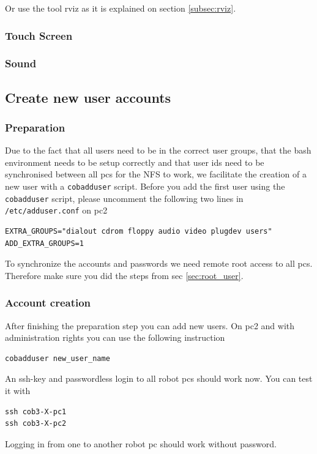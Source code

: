 Or use the tool rviz as it is explained on section \ref{subsec:rviz}.

\subsubsection{Touch Screen} 

\subsubsection{Sound}
 
\subsection{Create new user accounts}
\subsubsection{Preparation}
\label{sec:account}
Due to the fact that all users need to be in the correct user groups, that the bash environment needs to be setup correctly and that user ids need to be synchronised between all pcs for the NFS to work, we facilitate the creation of a new user with a \texttt{cobadduser} script. Before you add the first user using the \texttt{cobadduser} script, please uncomment the following two lines in \texttt{/etc/adduser.conf} on pc2
\begin{lstlisting}
EXTRA_GROUPS="dialout cdrom floppy audio video plugdev users"
ADD_EXTRA_GROUPS=1
\end{lstlisting}

To synchronize the accounts and passwords we need remote root access to all pcs. Therefore make sure you did the steps from sec \ref{sec:root_user}.

\subsubsection{Account creation}
After finishing the preparation step you can add new users. On pc2 and with administration rights you can use the following instruction
\begin{lstlisting}
cobadduser new_user_name
\end{lstlisting}

An ssh-key and passwordless login to all robot pcs should work now. You can test it with
\begin{lstlisting}
ssh cob3-X-pc1
ssh cob3-X-pc2
\end{lstlisting}
Logging in from one to another robot pc should work without password.

